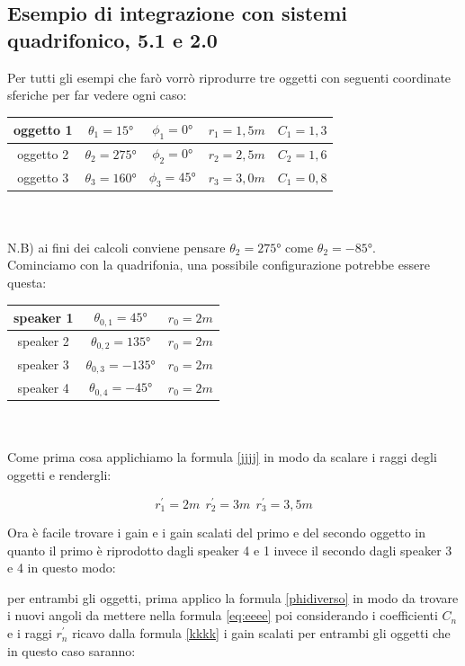 \documentclass[12pt,a4paper]{report}
\begin{document}
\subsection{Esempio di integrazione con sistemi quadrifonico, 5.1 e 2.0}

Per tutti gli esempi che farò vorrò riprodurre tre oggetti con seguenti coordinate sferiche per far vedere ogni caso:\\

\begin{tabular}{|c|c|c|c|c|}
\hline
oggetto 1 & $\theta_1=15°$ & $\phi_1=0°$ & $r_1=1,5m$ & $C_1=1,3$ \\
\hline
oggetto 2 & $\theta_2=275°$ & $\phi_2=0°$ & $r_2=2,5m$ & $C_2=1,6$ \\
\hline
oggetto 3 & $\theta_3=160°$ & $\phi_3=45°$ & $r_3=3,0m$ & $C_1=0,8$ \\
\hline

\end{tabular} \\ \\

N.B) ai fini dei calcoli conviene pensare $\theta_2=275°$ come $\theta_2=-85°$.\\

Cominciamo con la quadrifonia, una possibile configurazione potrebbe essere questa:\\

\begin{tabular}{|c|c|c|}
\hline
speaker 1 & $\theta_{0,1}=45°$ & $r_0=2m$\\
\hline
speaker 2 & $\theta_{0,2}=135°$ & $r_0=2m$\\
\hline
speaker 3 & $\theta_{0,3}=-135°$ & $r_0=2m$\\
\hline
speaker 4 & $\theta_{0,4}=-45°$ & $r_0=2m$\\
\hline
\end{tabular} \\
\\

Come prima cosa applichiamo la formula \ref{jjjj} in modo da scalare i raggi degli oggetti e rendergli:

\[r_1^{\prime}=2m \ \  r_2^{\prime}=3m \ \ r_3^{\prime}=3,5m  \]

Ora è facile trovare i gain e i gain scalati del primo e del secondo oggetto in quanto il primo è riprodotto dagli speaker 4 e 1 invece il secondo dagli speaker 3 e 4 in questo modo:

per entrambi gli oggetti, prima applico la formula \ref{phidiverso} in modo da trovare i nuovi angoli da mettere nella formula \ref{eq:eeee} poi considerando i coefficienti $C_n$ e i raggi $r_n^{\prime}$ ricavo dalla formula \ref{kkkk} i gain scalati per entrambi gli oggetti che in questo caso saranno:
\end{document}
